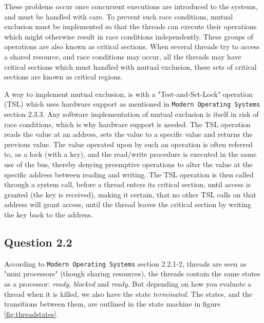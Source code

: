 These problems occur once concurrent executions are introduced to the systems, and must be handled with care. To prevent such race conditions, mutual exclusion must be implemented so that the threads can execute their operations which might otherwise result in race conditions independently. These groups of operations are also known as critical sections. When several threads try to access a shared resource, and race conditions may occur, all the threads may have critical sections which must handled with mutual exclusion, these sets of critical sections are known as critical regions.

A way to implement mutual exclusion, is with a "Test-and-Set-Lock" operation (TSL) which uses hardware support as mentioned in \texttt{Modern Operating Systems} section 2.3.3. Any software implementation of mutual exclusion is itself in risk of race conditions, which is why hardware support is needed. The TSL operation reads the value at an address, sets the value to a specific value and returns the previous value. The value operated upon by such an operation is often referred to, as a lock (with a key), and the read/write procedure is executed in the same use of the bus, thereby denying preemptive operations to alter the value at the specific address between reading and writing. The TSL operation is then called through a system call, before a thread enters its critical section, until access is granted (the key is received), making it certain, that no other TSL calls on that address will grant access, until the thread leaves the critical section by writing the key back to the address. 

\subsection*{Question 2.2}

According to \texttt{Modern Operating Systems} section 2.2.1-2, threads are seen as "mini processors" (though sharing resources), the threads contain the same states as a processor: \textit{ready}, \textit{blocked} and \textit{ready}. But depending on how you evaluate a thread when it is killed, we also have the state \textit{terminated}. The states, and the transitions between them, are outlined in the state machine in figure \ref{fig:threadstates}.

